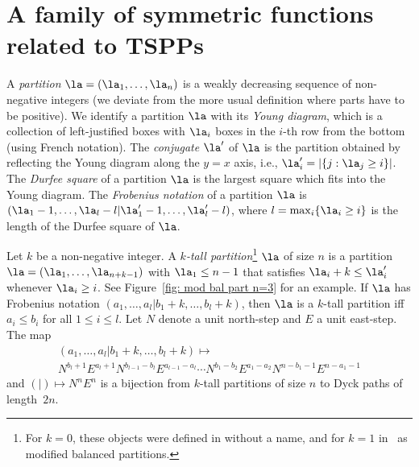 \section{A family of symmetric functions related to TSPPs}
\label{sec: TSPPs}

A \emph{partition} $\la=(\la_1,\ldots,\la_n)$ is a weakly decreasing sequence of non-negative integers (we deviate from the more usual definition where parts have to be positive). We identify a partition $\la$ with its \emph{Young diagram}, which is a collection of left-justified boxes with $\la_i$ boxes in the $i$-th row from the bottom (using French notation). The \emph{conjugate} $\la^\prime$ of $\la$ is the partition obtained by reflecting the Young diagram along the $y=x$ axis, i.e., $\la^\prime_i=|\{j: \la_j \geq i\}|$. The \emph{Durfee square} of a partition $\la$ is the largest square which fits into the Young diagram. The \emph{Frobenius notation} of a partition $\la$ is $(\la_1-1,\ldots,\la_l-l|\la_1^\prime-1,\ldots,\la_l^\prime-l)$, where $l= \max_i\{ \la_i \geq i \}$ is the length of the Durfee square of $\la$.
 
Let $k$ be a non-negative integer. A \emph{$k$-tall partition}\footnote{For $k=0$, these objects were defined in \cite[Ex 6.16(bb), p.223]{Stanley99} without a name, and for $k=1$ in~\cite{AignerFischerKonvalinkaNadeauTewari20} as modified balanced partitions.} $\la$ of size $n$ is a partition $\la=(\la_1,\ldots,\la_{n+k-1})$ with $\la_1\leq n-1$ that satisfies $\la_i +k \leq \la_i^\prime$ whenever $\la_i \geq i$. See Figure~\ref{fig: mod bal part n=3} for an example.
 If $\la$ has Frobenius notation $(a_1,\ldots,a_l|b_1+k,\ldots,b_l+k)$, then $\la$ is a $k$-tall partition iff $a_i \leq b_i$ for all $1 \leq i \leq l$. Let $N$ denote a unit north-step and $E$ a unit east-step. The map
\begin{multline*}
(a_1,\ldots,a_l|b_1+k,\ldots,b_l+k) \mapsto \\
N^{b_l+1}E^{a_l+1}N^{b_{l-1}-b_l}E^{a_{l-1}-a_l} \cdots N^{b_1-b_2}E^{a_1-a_2}N^{n-b_1-1}E^{n-a_1-1}
\end{multline*}
and $(|) \mapsto N^nE^n$ is a bijection from $k$-tall partitions of size $n$ to Dyck paths of length~$2n$.

